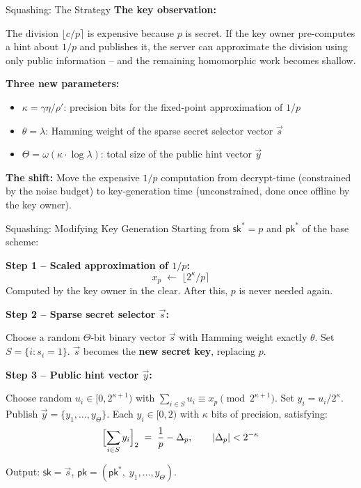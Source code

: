 \documentclass[10pt,handout]{beamer}
\begin{document}
\begin{frame}{Squashing: The Strategy}
    \textbf{The key observation:}

    The division $\lfloor c/p \rceil$ is expensive because $p$ is secret.
    If the key owner pre-computes a hint about $1/p$ and publishes it,
    the server can approximate the division using only public information  -- 
    and the remaining homomorphic work becomes shallow.
    \pause

    \vspace{0.3cm}
    \textbf{Three new parameters:}
    \begin{itemize}
        \item $\kappa = \gamma\eta/\rho'$:\quad
              precision bits for the fixed-point approximation of $1/p$
        \item $\theta = \lambda$:\quad
              Hamming weight of the sparse secret selector vector $\vec{s}$
        \item $\Theta = \omega(\kappa \cdot \log\lambda)$:\quad
              total size of the public hint vector $\vec{y}$
    \end{itemize}
    \pause

    \vspace{0.3cm}
    \textbf{The shift:} Move the expensive $1/p$ computation from
    decrypt-time (constrained by the noise budget) to key-generation time
    (unconstrained, done once offline by the key owner).
\end{frame}

\begin{frame}{Squashing: Modifying Key Generation}
    Starting from $\mathsf{sk}^* = p$ and $\mathsf{pk}^*$ of the base scheme:

    \vspace{0.15cm}
    \textbf{Step 1  --  Scaled approximation of $1/p$:}
    \[
        x_p \;\leftarrow\; \lfloor 2^\kappa / p \rceil
    \]
    Computed by the key owner in the clear. After this, $p$ is never needed again.
    \pause

    \vspace{0.15cm}
    \textbf{Step 2  --  Sparse secret selector $\vec{s}$:}

    Choose a random $\Theta$-bit binary vector $\vec{s}$ with Hamming weight
    exactly $\theta$. Set $S = \{i : s_i = 1\}$.
    $\vec{s}$ becomes the \textbf{new secret key}, replacing $p$.
    \pause

    \vspace{0.15cm}
    \textbf{Step 3  --  Public hint vector $\vec{y}$:}

    Choose random $u_i \in [0, 2^{\kappa+1})$ with
    $\sum_{i \in S} u_i \equiv x_p \pmod{2^{\kappa+1}}$.
    Set $y_i = u_i / 2^\kappa$. Publish $\vec{y} = \{y_1, \ldots, y_\Theta\}$.
    Each $y_i \in [0,2)$ with $\kappa$ bits of precision, satisfying:
    \[
        \Bigl[\sum_{i \in S} y_i\Bigr]_2 \;=\; \frac{1}{p} - \Delta_p,
        \qquad |\Delta_p| < 2^{-\kappa}
    \]

    Output: $\mathsf{sk} = \vec{s}$,\quad
    $\mathsf{pk} = (\mathsf{pk}^*,\; y_1, \ldots, y_\Theta)$.
\end{frame}
\end{document}
